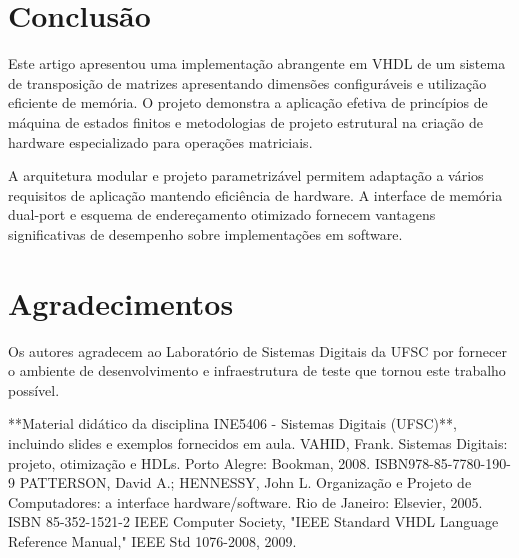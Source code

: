 \documentclass[conference]{IEEEtran}
\begin{document}
\section{Conclusão}

Este artigo apresentou uma implementação abrangente em VHDL de um sistema de transposição de matrizes apresentando dimensões configuráveis e utilização eficiente de memória. O projeto demonstra a aplicação efetiva de princípios de máquina de estados finitos e metodologias de projeto estrutural na criação de hardware especializado para operações matriciais.

A arquitetura modular e projeto parametrizável permitem adaptação a vários requisitos de aplicação mantendo eficiência de hardware. A interface de memória dual-port e esquema de endereçamento otimizado fornecem vantagens significativas de desempenho sobre implementações em software.

\section*{Agradecimentos}

Os autores agradecem ao Laboratório de Sistemas Digitais da UFSC por fornecer o ambiente de desenvolvimento e infraestrutura de teste que tornou este trabalho possível.

\begin{thebibliography}{00}
 **Material didático da disciplina INE5406 - Sistemas Digitais (UFSC)**, incluindo slides e exemplos fornecidos em aula. 
 VAHID, Frank. Sistemas Digitais: projeto, otimização e HDLs. Porto Alegre: Bookman, 2008. ISBN978-85-7780-190-9
 PATTERSON, David A.; HENNESSY, John L. Organização e Projeto de Computadores: a interface
hardware/software. Rio de Janeiro: Elsevier, 2005. ISBN 85-352-1521-2
 IEEE Computer Society, "IEEE Standard VHDL Language Reference Manual," IEEE Std 1076-2008, 2009.

\end{thebibliography}
\end{document}
